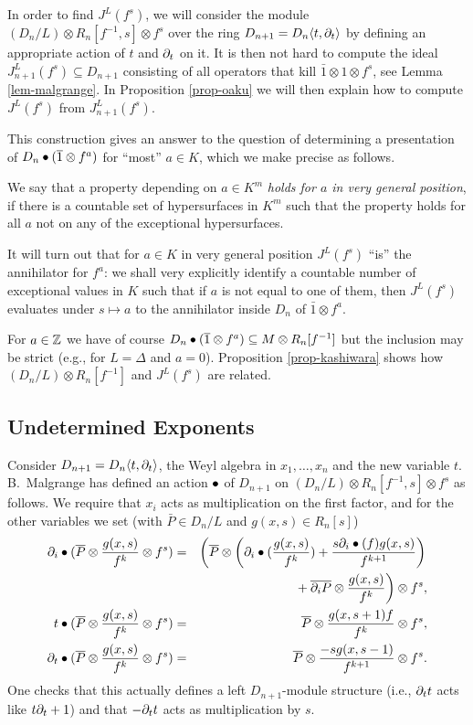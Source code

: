 In order to find $J^L(f^s)$, we will consider the module 
$(D_n/L)\otimes R_n[f^{-1},s]\otimes f^s$ over the ring $D_{n+1}=D_n\langle
t,\partial_t\rangle$ by defining an appropriate action of $t$ and $\partial_t$
on it. It is then not hard to 
compute the ideal $J^L_{n+1}(f^s)\subseteq D_{n+1}$ consisting of all
operators that kill $\bar 1\otimes 1\otimes f^s$, see Lemma
\ref{lem-malgrange}.  
In Proposition \ref{prop-oaku} 
we will then explain how to compute $J^L(f^s)$ from $J_{n+1}^L(f^s)$. 

This construction 
gives an answer to the question of determining
a presentation of  $D_n\bullet (\overline{1}\otimes f^a)$ for ``most'' $a\in
K$, which we make precise as follows.
\begin{definition}
We say that a property depending on $a\in K^m$ {\em holds for $a$
 in
very general position}, if there is a countable set of hypersurfaces
 in $K^m$ such that the property holds for all $a$ not on any of the
 exceptional hypersurfaces. 
\end{definition}
It will turn out that for $a\in K$ in very general position $J^L(f^s)$
``is'' the annihilator for $f^a$: we shall very explicitly 
identify a countable number of
exceptional values
in $K$ such that if $a$ is not equal to one of them, then $J^L(f^s)$
evaluates under $s\mapsto a$ to the annihilator inside $D_n$ of $\bar 1\otimes f^a$.
  
For $a\in{\mathbb Z}$ we have
of course
$D_n\bullet (\overline{1}\otimes f^a)\subseteq M\otimes 
R_n[f^{-1}]$ but the inclusion may be strict
(e.g., for $L=\Delta$ and $a=0$). 
Proposition \ref{prop-kashiwara}
shows how 
$(D_n/L)\otimes R_n[f^{-1}]$ and
$J^L(f^s)$ are related.
\subsection{Undetermined Exponents}
Consider $D_{n+1}=D_n\langle t,\partial_t\rangle$,  
the Weyl algebra in
$x_1,\ldots,x_n$ and the new variable $t$. B.\ Malgrange
\cite{DM:M} 
has defined an 
action $\bullet$ of $D_{n+1}$ on 
$(D_n/L)\otimes R_n[f^{-1},s]\otimes f^s$ as follows.
We require that $x_i$ acts as multiplication on the first factor, and
for the other variables we set (with $\bar P\in D_n/L$ and  $g(x,s)\in
R_n[s]$) 
\begin{eqnarray*}
\partial_i\bullet(\overline{P}\otimes \frac{g(x,s)}{f^k}\otimes f^s)&=
  &\left(\overline{P}\otimes
  \left(\partial_i\bullet(\frac{g(x,s)}{f^k})+\frac{s\partial_i\bullet(f)g(x,s)}{f^{k+1}}\right)  
\right. \\ & & \left. \quad {}
   +\overline{\partial_iP}\otimes \frac{g(x,s)}{f^k}\right)\otimes f^s,\\
t\bullet(\overline{P}\otimes \frac{g(x,s)}{f^k}\otimes f^s)&=
  &\overline{P}\otimes \frac{g(x,s+1)f}{f^k}\otimes f^s,\\
\partial_t\bullet(\overline{P}\otimes \frac{g(x,s)}{f^k}\otimes f^s)&=
  &\overline{P}\otimes \frac{-sg(x,s-1)}{f^{k+1}} \otimes f^s.
\end{eqnarray*}
One checks that this actually
defines a left $D_{n+1}$-module structure 
 (i.e., $\partial_tt$ acts like $t\partial_t+1$) 
and that
$-\partial_tt$ acts as 
multiplication by $s$. 


